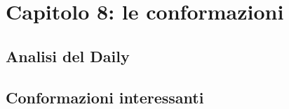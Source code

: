 
\chapter{Capitolo 8: le conformazioni}

\section{Analisi del Daily}












\section{Conformazioni interessanti}
